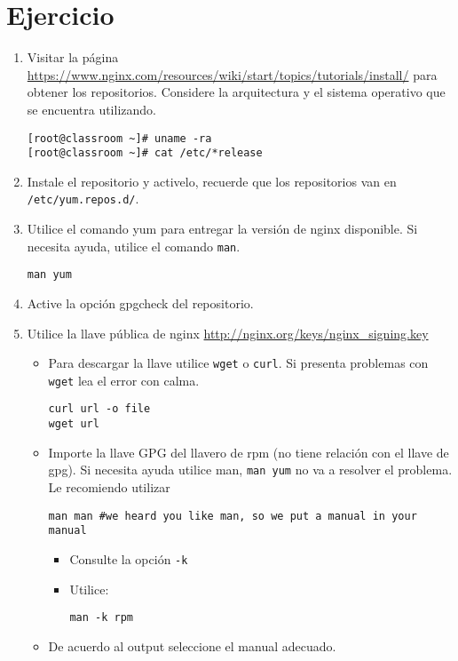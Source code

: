 \documentclass[11pt]{exam}
\begin{document}
\section{Ejercicio}
\begin{enumerate}
	\item Visitar la página \url{https://www.nginx.com/resources/wiki/start/topics/tutorials/install/} para obtener los repositorios. Considere la arquitectura y el sistema operativo que se encuentra utilizando.
	\begin{lstlisting}
[root@classroom ~]# uname -ra
[root@classroom ~]# cat /etc/*release
	\end{lstlisting}

	\item Instale el repositorio y activelo, recuerde que los repositorios van en \texttt{/etc/yum.repos.d/}.

	\item Utilice el comando yum para entregar la versión de nginx disponible. Si necesita ayuda, utilice el comando \texttt{man}.
	\begin{lstlisting}
man yum
	\end{lstlisting}

	\item Active la opción gpgcheck del repositorio.

	\item Utilice la llave pública de nginx \url{http://nginx.org/keys/nginx_signing.key}
	\begin{itemize}
		\item Para descargar la llave utilice \texttt{wget} o  \texttt{curl}. Si presenta problemas con \texttt{wget} lea el error con calma.
	\begin{lstlisting}
curl url -o file
wget url
	\end{lstlisting}
	\item Importe la llave GPG del llavero de rpm (no tiene relación con el llave de gpg). Si necesita ayuda utilice man, \texttt{man yum} no va a resolver el problema. Le recomiendo utilizar
	\begin{lstlisting}
man man #we heard you like man, so we put a manual in your manual
	\end{lstlisting}
	\begin{itemize}
		\item Consulte la opción \texttt{-k}
		\item Utilice:
		\begin{lstlisting}
man -k rpm
		\end{lstlisting}
	\end{itemize}
	\item De acuerdo al output seleccione el manual adecuado.
	\end{itemize}


\end{enumerate}
\end{document}
